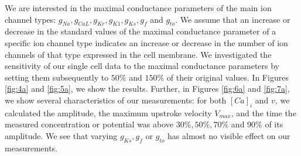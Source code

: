 \documentclass{article}
\begin{document}
We are interested in the maximal conductance parameters of the main ion channel types: $g_{Na}, g_{CaL}, g_{Kr}, g_{K1}, g_{Ks}, g_{f}$ and $g_{to}$. We assume that an increase or decrease in the standard values of the maximal conductance parameter of a specific ion channel type indicates an increase or decrease in the number of ion channels of that type expressed in the cell membrane. We investigated the sensitivity of our single cell data to the maximal conductance parameters by setting them subsequently to $50\%$ and $150\%$ of their original values. In Figures \ref{fig:4a} and \ref{fig:5a}, we show the results. Further, in Figures \ref{fig:6a} and \ref{fig:7a}, we show several characteristics of our measurements: for both $[Ca]_i$ and $v$, we calculated the amplitude, the maximum upstroke velocity $V_{max}$, and the time the measured concentration or potential was above $30\%, 50\%, 70\%$ and $90\%$ of its amplitude. We see that varying $g_{Ks}, g_{f}$ or $g_{to}$ has almost no visible effect on our measurements.
%
\end{document}
